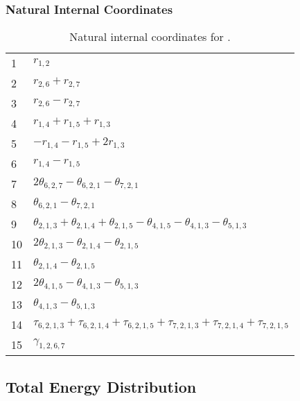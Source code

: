 \documentclass[10pt,oneside]{article}
\begin{document}
\begin{table}[h!]
\subsubsection*{Natural Internal Coordinates}
\centering
\caption{Natural internal coordinates for .}
\small
\begin{tabular}{ll}
\toprule
  1   & $r_{1,2}$ \\
  2   & $r_{2,6} + r_{2,7}$ \\
  3   & $r_{2,6} - r_{2,7}$ \\
  4   & $r_{1,4} + r_{1,5} + r_{1,3}$ \\
  5   & $-r_{1,4} - r_{1,5} + 2r_{1,3}$ \\
  6   & $r_{1,4} - r_{1,5}$ \\
  7   & $2\theta_{6,2,7} - \theta_{6,2,1} - \theta_{7,2,1}$ \\
  8   & $\theta_{6,2,1} - \theta_{7,2,1}$ \\
  9   & $\theta_{2,1,3} + \theta_{2,1,4} + \theta_{2,1,5} - \theta_{4,1,5} - \theta_{4,1,3} - \theta_{5,1,3}$ \\
  10  & $2\theta_{2,1,3} - \theta_{2,1,4} - \theta_{2,1,5}$ \\
  11  & $\theta_{2,1,4} - \theta_{2,1,5}$ \\
  12  & $2\theta_{4,1,5} - \theta_{4,1,3} - \theta_{5,1,3}$ \\
  13  & $\theta_{4,1,3} - \theta_{5,1,3}$ \\
  14  & $\tau_{6,2,1,3} + \tau_{6,2,1,4} + \tau_{6,2,1,5} + \tau_{7,2,1,3} + \tau_{7,2,1,4} + \tau_{7,2,1,5}$ \\
  15  & $\gamma_{1,2,6,7}$ \\
\bottomrule
\end{tabular}
\end{table}

\begin{table}
\subsection*{Total Energy Distribution}
\centering\end{table}

\clearpage

\subsection{}
\end{document}
